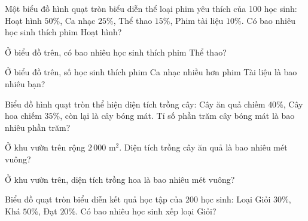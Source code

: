 
\begin{ex}
  Một biểu đồ hình quạt tròn biểu diễn thể loại phim yêu thích của 100 học sinh: Hoạt hình $50\%$, Ca nhạc $25\%$, Thể thao $15\%$, Phim tài liệu $10\%$. Có bao nhiêu học sinh thích phim Hoạt hình?
\end{ex}

\begin{ex}
  Ở biểu đồ trên, có bao nhiêu học sinh thích phim Thể thao?
\end{ex}

\begin{ex}
  Ở biểu đồ trên, số học sinh thích phim Ca nhạc nhiều hơn phim Tài liệu là bao nhiêu bạn?
\end{ex}

\begin{ex}
  Biểu đồ hình quạt tròn thể hiện diện tích trồng cây: Cây ăn quả chiếm $40\%$, Cây hoa chiếm $35\%$, còn lại là cây bóng mát. Tỉ số phần trăm cây bóng mát là bao nhiêu phần trăm?
\end{ex}

\begin{ex}
  Ở khu vườn trên rộng $2\,000\text{ m}^2$. Diện tích trồng cây ăn quả là bao nhiêu mét vuông?
\end{ex}

\begin{ex}
  Ở khu vườn trên, diện tích trồng hoa là bao nhiêu mét vuông?
\end{ex}

\begin{ex}
  Biểu đồ quạt tròn biểu diễn kết quả học tập của 200 học sinh: Loại Giỏi $30\%$, Khá $50\%$, Đạt $20\%$. Có bao nhiêu học sinh xếp loại Giỏi?
\end{ex}

